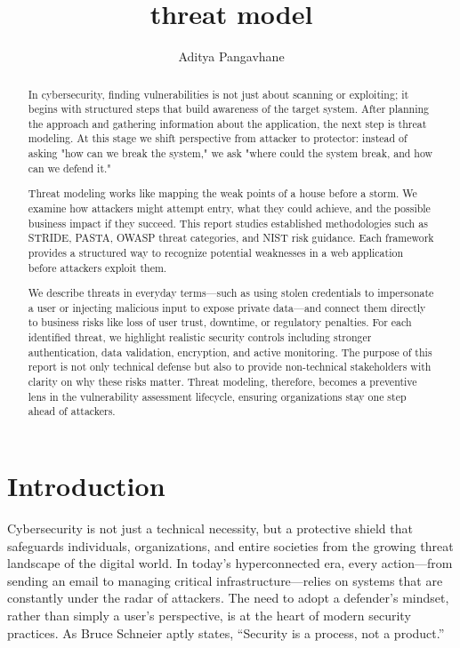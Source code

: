 \documentclass{article}
\title{threat model}
\author{Aditya Pangavhane}
\begin{document}
\maketitle

\begin{abstract}
In cybersecurity, finding vulnerabilities is not just about scanning or exploiting; it begins with structured steps that build awareness of the target system. After planning the approach and gathering information about the application, the next step is threat modeling. At this stage we shift perspective from attacker to protector: instead of asking "how can we break the system," we ask "where could the system break, and how can we defend it." 

Threat modeling works like mapping the weak points of a house before a storm. We examine how attackers might attempt entry, what they could achieve, and the possible business impact if they succeed. This report studies established methodologies such as STRIDE, PASTA, OWASP threat categories, and NIST risk guidance. Each framework provides a structured way to recognize potential weaknesses in a web application before attackers exploit them. 

We describe threats in everyday terms—such as using stolen credentials to impersonate a user or injecting malicious input to expose private data—and connect them directly to business risks like loss of user trust, downtime, or regulatory penalties. For each identified threat, we highlight realistic security controls including stronger authentication, data validation, encryption, and active monitoring. The purpose of this report is not only technical defense but also to provide non-technical stakeholders with clarity on why these risks matter. Threat modeling, therefore, becomes a preventive lens in the vulnerability assessment lifecycle, ensuring organizations stay one step ahead of attackers.
\end{abstract}

\section{Introduction}

Cybersecurity is not just a technical necessity, but a protective shield that safeguards individuals, organizations, and entire societies from the growing threat landscape of the digital world. In today’s hyperconnected era, every action—from sending an email to managing critical infrastructure—relies on systems that are constantly under the radar of attackers. The need to adopt a defender’s mindset, rather than simply a user’s perspective, is at the heart of modern security practices. As Bruce Schneier aptly states, “Security is a process, not a product.” \cite{schneier1999secrets}
\end{document}
